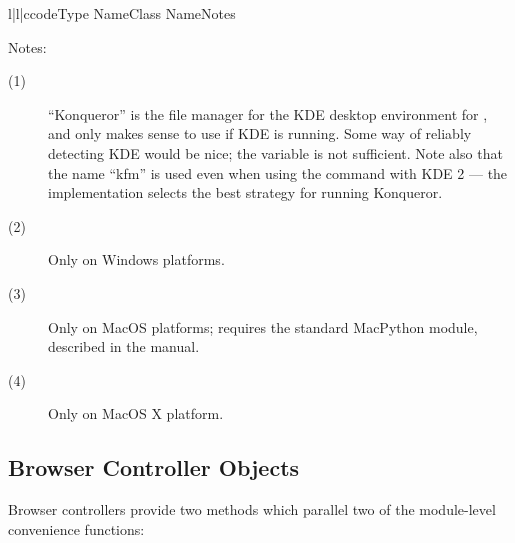 \begin{tableiii}{l|l|c}{code}{Type Name}{Class Name}{Notes}
\end{tableiii}

\noindent
Notes:

\begin{description}
\item[(1)]
``Konqueror'' is the file manager for the KDE desktop environment for
\UNIX{}, and only makes sense to use if KDE is running.  Some way of
reliably detecting KDE would be nice; the  variable is
not sufficient.  Note also that the name ``kfm'' is used even when
using the  command with KDE 2 --- the
implementation selects the best strategy for running Konqueror.

\item[(2)]
Only on Windows platforms.

\item[(3)]
Only on MacOS platforms; requires the standard MacPython 
module, described in the  manual.

\item[(4)]
Only on MacOS X platform.
\end{description}


\subsection{Browser Controller Objects \label{browser-controllers}}

Browser controllers provide two methods which parallel two of the
module-level convenience functions:

